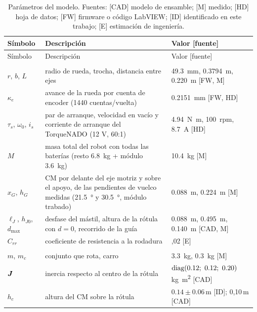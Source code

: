 \begin{small}
\begin{longtable}{@{}>{\raggedright\arraybackslash}p{}>{\raggedright\arraybackslash}p{}>{\raggedleft\arraybackslash}p{}@{}}
\caption{Parámetros del modelo. Fuentes: [CAD] modelo de ensamble; [M] medido; [HD] hoja de datos; [FW] firmware o código LabVIEW; [ID] identificado en este trabajo; [E] estimación de ingeniería.}\label{tab:params}\\
\toprule
Símbolo & Descripción & Valor [fuente] \\
\midrule\endfirsthead
\toprule Símbolo & Descripción & Valor [fuente] \\ \midrule\endhead
\multicolumn{3}{@{}l}{\emph{Base móvil}}\\
$r$, $b$, $L$ & radio de rueda, trocha, distancia entre ejes & \SI{49.3}{\milli\metre}, \SI{0.3794}{\metre}, \SI{0.220}{\metre} [FW, M] \\
$\kappa_e$ & avance de la rueda por cuenta de encoder (1440 cuentas/vuelta) & \SI{0.2151}{\milli\metre} [FW, HD] \\
$\tau_s$, $\omega_0$, $i_s$ & par de arranque, velocidad en vacío y corriente de arranque del TorqueNADO (12 V, 60:1) & \SI{4.94}{\newton\metre}, \SI{100}{rpm}, \SI{8.7}{\ampere} [HD] \cite{pitsco_torquenado} \\
$M$ & masa total del robot con todas las baterías (resto \SI{6.8}{\kilo\gram} + módulo \SI{3.6}{\kilo\gram}) & \SI{10.4}{\kilo\gram} [M] \\
$x_G$, $h_G$ & CM por delante del eje motriz y sobre el apoyo, de las pendientes de vuelco medidas (\SI{21.5}{\degree} y \SI{30.5}{\degree}, módulo trabado) & \SI{0.088}{\metre}, \SI{0.224}{\metre} [M] \\
$\ell_J$, $h_{J0}$, $d_{\max}$ & desfase del mástil, altura de la rótula con $d=0$, recorrido de la guía & \SI{0.088}{\metre}, \SI{0.495}{\metre}, \SI{0.140}{\metre} [CAD, M] \\
$C_{rr}$ & coeficiente de resistencia a la rodadura & 0,02 [E] \\
\midrule
\multicolumn{3}{@{}l}{\emph{Módulo aéreo}}\\
$m$, $m_c$ & conjunto que rota, carro & \SI{3.3}{\kilo\gram}, \SI{0.3}{\kilo\gram} [M] \\
$\bm{J}$ & inercia respecto al centro de la rótula & $\diag(0.12;\ 0.12;\ 0.20)$\,\si{\kilo\gram\metre\squared} [CAD] \\
$h_c$ & altura del CM sobre la rótula & $0.14\pm0.06$\,m [ID]; 0,10\,m [CAD] \\

\end{longtable}
\end{small}
